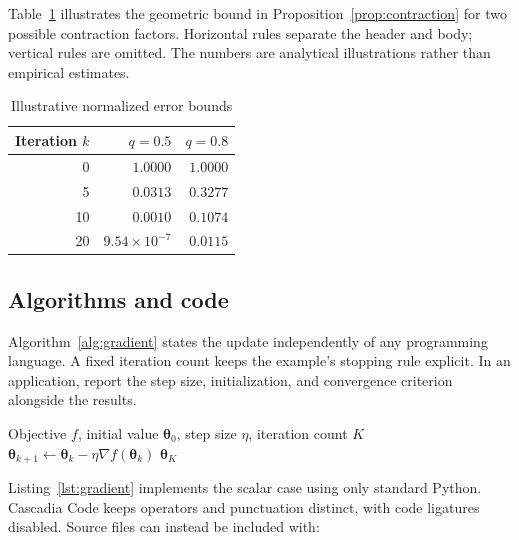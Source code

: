 \expandafter\documentclass\expandafter[\documentclassoptions]{article}
\begin{document}
Table~\ref{tab:convergence} illustrates the geometric bound in
Proposition~\ref{prop:contraction} for two possible contraction factors.
Horizontal rules separate the header and body; vertical rules are omitted.
The numbers are analytical illustrations rather than empirical estimates.

\begin{table}[tbp]
  \centering
  \caption{Illustrative normalized error bounds}\label{tab:convergence}
  \begin{tabular}{@{}rrr@{}}
    \toprule
    Iteration $k$ & $q=0.5$ & $q=0.8$ \\
    \midrule
     0 & $1.0000$ & $1.0000$ \\
     5 & $0.0313$ & $0.3277$ \\
    10 & $0.0010$ & $0.1074$ \\
    20 & $9.54\times10^{-7}$ & $0.0115$ \\
    \bottomrule
  \end{tabular}
\end{table}

\subsection{Algorithms and code}

Algorithm~\ref{alg:gradient} states the update independently of any programming
language. A fixed iteration count keeps the example's stopping rule explicit.
In an application, report the step size, initialization, and convergence
criterion alongside the results.

\begin{algorithm}[tbp]
  \caption{Gradient descent with a fixed iteration count}\label{alg:gradient}
  \begin{algorithmic}[1]
    \Require Objective $f$, initial value $\bm{\theta}_0$, step size $\eta$,
      iteration count $K$
      \State $\bm{\theta}_{k+1}\gets\bm{\theta}_k-\eta\nabla f(\bm{\theta}_k)$
    \EndFor
    \State \Return $\bm{\theta}_K$
  \end{algorithmic}
\end{algorithm}

Listing~\ref{lst:gradient} implements the scalar case using only standard
Python. Cascadia Code keeps operators and punctuation distinct, with code
ligatures disabled. Source files can instead be included with:
\begin{lstlisting}[language={[LaTeX]TeX},numbers=none]

\end{lstlisting}
\end{document}
